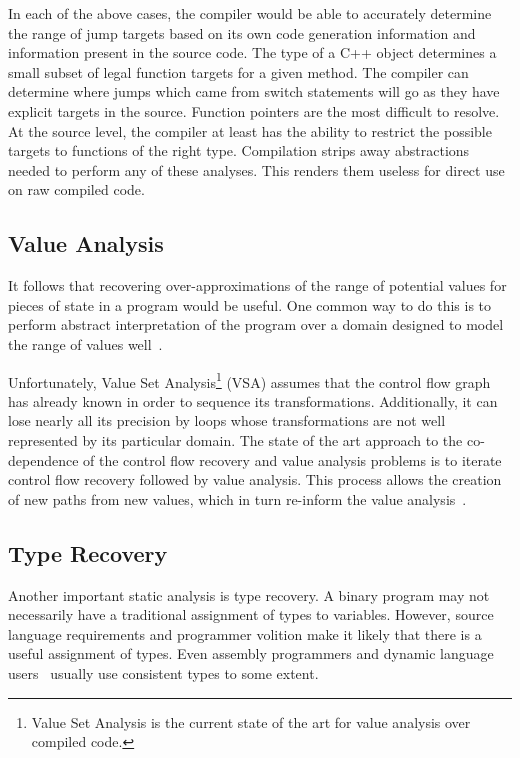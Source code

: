 In each of the above cases, the compiler would be able to accurately determine the range of jump targets based on its own code generation information and information present in the source code.
The type of a C++ object determines a small subset of legal function targets for a given method.
The compiler can determine where jumps which came from switch statements will go as they have explicit targets in the source.
Function pointers are the most difficult to resolve.
At the source level, the compiler at least has the ability to restrict the possible targets to functions of the right type.
Compilation strips away abstractions needed to perform any of these analyses.
This renders them useless for direct use on raw compiled code.

\subsection{Value Analysis}
\label{sec:valanal}
It follows that recovering over-approximations of the range of potential values for pieces of state in a program would be useful.
One common way to do this is to perform abstract interpretation of the program over a domain designed to model the range of values well~\cite{vsa,wrappedintervals,wrappedintervals2}.

Unfortunately, Value Set Analysis\footnote{
  Value Set Analysis is the current state of the art for value analysis over compiled code.
} (VSA) assumes that the control flow graph has already known in order to sequence its transformations.
Additionally, it can lose nearly all its precision by loops whose transformations are not well represented by its particular domain.
The state of the art approach to the co-dependence of the control flow recovery and value analysis problems is to iterate control flow recovery followed by value analysis.
This process allows the creation of new paths from new values, which in turn re-inform the value analysis~\cite{jakstab}.

\subsection{Type Recovery}
Another important static analysis is type recovery.
A binary program may not necessarily have a traditional assignment of types to variables.
However, source language requirements and programmer volition make it likely that there is a useful assignment of types.
Even assembly programmers and dynamic language users~\cite{jsinfer} usually use consistent types to some extent.

